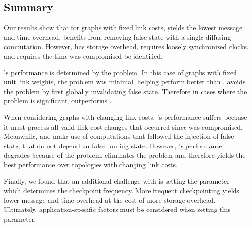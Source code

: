 \subsection{Summary}
\label{subsec:discuss}

Our results show that for graphs with fixed link costs, \cpr yields the lowest message and time overhead. \cpr benefits from removing false state with a single
diffusing computation. However, \cpr has storage overhead, requires loosely synchronized clocks, and requires the time \bad was compromised be identified.

\seconds's performance is determined by the \infinity problem. In this case of \er graphs with fixed unit link weights, the \infinity problem was minimal, 
helping \second perform better than \purges. \purge avoids the \infinity problem by first globally invalidating false state.  Therefore in cases where the \infinity problem is 
significant, \purge outperforms \seconds.

When considering graphs with changing link costs, \cprs's performance suffers because it must process all valid link cost changes that occurred since \bad was compromised.
Meanwhile, \second and \purge make use of computations that followed the injection of false state, that do not depend on false routing state. However, \seconds's performance degrades 
because of the \infinity problem.  \purge eliminates the \infinity problem and therefore yields the best performance over topologies with changing link costs.

Finally, we found that an additional challenge with \cpr is setting the parameter which determines the checkpoint frequency.
More frequent checkpointing yields lower message and time overhead at the cost of more storage overhead. Ultimately, application-specific factors must be considered
when setting this parameter. 

